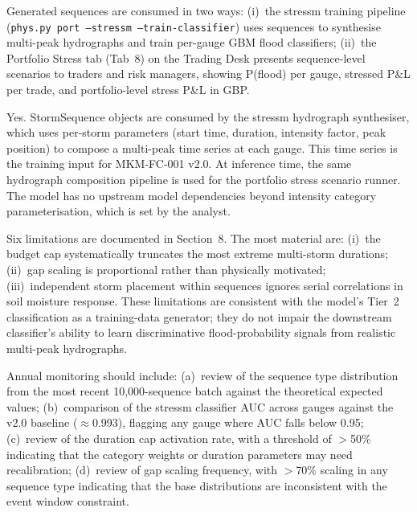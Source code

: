 \documentclass[11pt,a4paper]{article}
\begin{document}
Generated sequences are consumed in two ways: (i)~the stressm training pipeline (\texttt{phys.py port --stressm --train-classifier}) uses sequences to synthesise multi-peak hydrographs and train per-gauge GBM flood classifiers; (ii)~the Portfolio Stress tab (Tab~8) on the Trading Desk presents sequence-level scenarios to traders and risk managers, showing P(flood) per gauge, stressed P\&L per trade, and portfolio-level stress P\&L in GBP.

Yes. StormSequence objects are consumed by the stressm hydrograph synthesiser, which uses per-storm parameters (start time, duration, intensity factor, peak position) to compose a multi-peak time series at each gauge. This time series is the training input for MKM-FC-001 v2.0. At inference time, the same hydrograph composition pipeline is used for the portfolio stress scenario runner. The model has no upstream model dependencies beyond intensity category parameterisation, which is set by the analyst.

Six limitations are documented in Section~8. The most material are: (i)~the budget cap systematically truncates the most extreme multi-storm durations; (ii)~gap scaling is proportional rather than physically motivated; (iii)~independent storm placement within sequences ignores serial correlations in soil moisture response. These limitations are consistent with the model's Tier~2 classification as a training-data generator; they do not impair the downstream classifier's ability to learn discriminative flood-probability signals from realistic multi-peak hydrographs.

Annual monitoring should include: (a)~review of the sequence type distribution from the most recent 10{,}000-sequence batch against the theoretical expected values; (b)~comparison of the stressm classifier AUC across gauges against the v2.0 baseline ($\approx$0.993), flagging any gauge where AUC falls below 0.95; (c)~review of the duration cap activation rate, with a threshold of $>$50\% indicating that the category weights or duration parameters may need recalibration; (d)~review of gap scaling frequency, with $>$70\% scaling in any sequence type indicating that the base distributions are inconsistent with the event window constraint.
\end{document}
